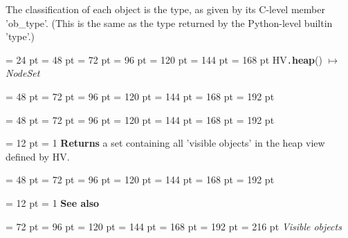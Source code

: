 {{{{{{The classification of each object is the type, as given by its
C-level member 'ob{\_}type'. (This is the same as the type returned
by the Python-level builtin 'type'.)
\par}
\par}
\par}
\par}
\par}
{\par \noindent  \leftskip = 24 pt  \leftmargini = 48 pt  \leftmarginii = 72 pt  \leftmarginiii = 96 pt  \leftmarginiv = 120 pt  \leftmarginv = 144 pt  \leftmarginvi = 168 pt HV{\tt .\/}{\bf {\large {\bf heap\/}}\/}() \(\mapsto \)  {\em NodeSet\/}{\par \noindent
{\par \noindent  \leftskip = 48 pt  \leftmargini = 72 pt  \leftmarginii = 96 pt  \leftmarginiii = 120 pt  \leftmarginiv = 144 pt  \leftmarginv = 168 pt  \leftmarginvi = 192 pt {\par \noindent
\par}
\par}
{\par \noindent  \leftskip = 48 pt  \leftmargini = 72 pt  \leftmarginii = 96 pt  \leftmarginiii = 120 pt  \leftmarginiv = 144 pt  \leftmarginv = 168 pt  \leftmarginvi = 192 pt {\par \noindent
{\par \pagebreak[3.100000] \noindent \hangindent = 12 pt \hangafter = 1 
{\bf Returns \/} a set containing all 'visible objects' in the heap view
defined by HV.\par}
\par}
\par}
{\par \noindent  \leftskip = 48 pt  \leftmargini = 72 pt  \leftmarginii = 96 pt  \leftmarginiii = 120 pt  \leftmarginiv = 144 pt  \leftmarginv = 168 pt  \leftmarginvi = 192 pt {\par \noindent
{\par \pagebreak[3.100000] \noindent \hangindent = 12 pt \hangafter = 1 
{\bf See also\/}\par}
{\par \noindent  \leftskip = 72 pt  \leftmargini = 96 pt  \leftmarginii = 120 pt  \leftmarginiii = 144 pt  \leftmarginiv = 168 pt  \leftmarginv = 192 pt  \leftmarginvi = 216 pt   {\em  Visible objects
\/}\par}
\par}
\par}
\par}
\par}
}
